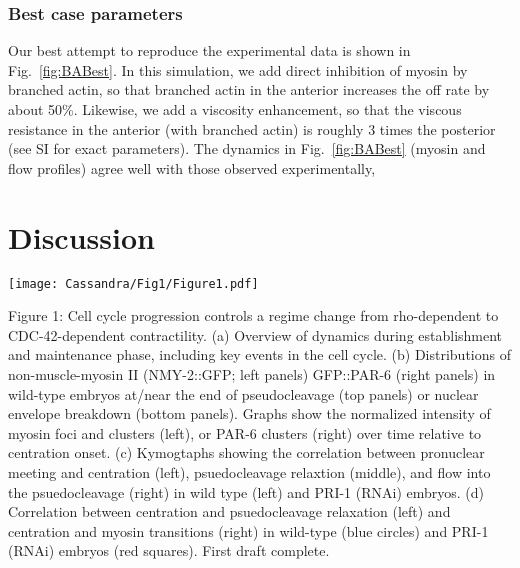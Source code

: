 \documentclass[11pt]{article}
\newcommand{\red}[1]{\color{red}#1\normalcolor}
\newcommand{\6}[1]{#1_{\text{6}}}
\newcommand{\3}[1]{#1_{\text{3}}}
\begin{document}
\subsubsection{Best case parameters}

Our best attempt to reproduce the experimental data is shown in Fig.\ \ref{fig:BABest}. In this simulation, we add direct inhibition of myosin by branched actin, so that branched actin in the anterior increases the off rate by about 50\%. Likewise, we add a viscosity enhancement, so that the viscous resistance in the anterior (with branched actin) is roughly 3 times the posterior (see SI for exact parameters). The dynamics in Fig.\ \ref{fig:BABest} (myosin and flow profiles) agree well with those observed experimentally, 



\section{Discussion}

\newpage 
\begin{center}
\texttt{[image: Cassandra/Fig1/Figure1.pdf]}
\end{center}

\newpage 
Figure 1: Cell cycle progression controls a regime change from rho-dependent to CDC-42-dependent contractility. (a) Overview of dynamics during establishment and maintenance phase, including key events in the cell cycle. (b) Distributions of non-muscle-myosin II (NMY-2::GFP; left panels) GFP::PAR-6 (right panels) in wild-type embryos at/near the end of pseudocleavage (top panels) or nuclear envelope breakdown (bottom panels). Graphs show the normalized intensity of myosin foci and clusters (left), or PAR-6 clusters (right) over time relative to centration onset. (c) Kymogtaphs showing the correlation between pronuclear meeting and centration (left), psuedocleavage relaxtion (middle), and flow into the psuedocleavage (right) in wild type (left) and PRI-1 (RNAi) embryos. (d) Correlation between centration and psuedocleavage relaxation (left) and centration and myosin transitions (right) in wild-type (blue circles) and PRI-1 (RNAi) embryos (red squares). \red{First draft complete.}
\end{document}
